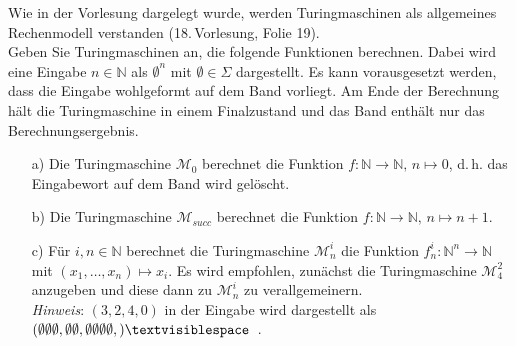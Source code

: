 
\begin{exercise}
Wie in der Vorlesung dargelegt wurde, werden Turingmaschinen als allgemeines Rechenmodell verstanden (18.\,Vorlesung, Folie 19).\\[0.2cm]
Geben Sie Turingmaschinen an, die folgende Funktionen 
berechnen. Dabei wird eine Eingabe $n\in \mathbb N$ als $\emptyset^n$ mit $\emptyset\in \Sigma$ dargestellt. Es kann vorausgesetzt werden, dass die Eingabe wohlgeformt auf dem Band vorliegt. Am Ende der Berechnung h\"alt die Turingmaschine in einem Finalzustand und das Band enth\"alt nur das Berechnungsergebnis. 
\begin{enumerate}
\item[a)] Die Turingmaschine $\mathcal M_{0}$ berechnet die
  Funktion $f:\mathbb N\rightarrow \mathbb N,\,n\mapsto 0$, d.\,h. das Eingabewort auf dem
  Band wird gelöscht.
\item[b)] Die Turingmaschine $\mathcal M_{succ}$ berechnet die
  Funktion $f:\mathbb N\rightarrow \mathbb N,\,n\mapsto n+1$.
\item[c)] Für $i,n\in \mathbb N$ berechnet die Turingmaschine $\mathcal M_{n}^i$
  die Funktion $f^i_n:\mathbb N^n\rightarrow \mathbb
  N$ mit $(x_1,\ldots,x_n)\mapsto x_i$. Es wird empfohlen, zunächst die
  Turingmaschine $\mathcal M_{4}^2$ anzugeben und diese dann zu
  $\mathcal M_{n}^i$ zu verallgemeinern.\\[1ex]
  \textit{Hinweis}: $(3,2,4,0)$ in der Eingabe wird dargestellt als \mbox{$(\emptyset\emptyset\emptyset,\emptyset\emptyset,\emptyset\emptyset\emptyset\emptyset,)\textvisiblespace$ }. 
\end{enumerate} 
\end{exercise}

